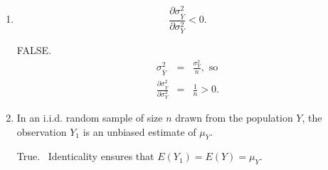 \documentclass[11pt]{article}
\begin{document}
\begin{enumerate}
\begin{enumerate}
\item 
\begin{equation*}
\frac{\partial \sigma _{\overline{Y}}^{2}}{\partial \sigma _{Y}^{2}}<0.
\end{equation*}

FALSE. 
\begin{eqnarray*}
\sigma _{\overline{Y}}^{2} &=&\frac{\sigma _{Y}^{2}}{n},\text{ so} \\
\frac{\partial \sigma _{\overline{Y}}^{2}}{\partial \sigma _{Y}^{2}} &=&%
\frac{1}{n}>0.
\end{eqnarray*}

\item In an i.i.d. random sample of size $n$ drawn from the population $Y$,
the observation $Y_{1}$ is an unbiased estimate of $\mu _{Y}.$

True. \ Identicality ensures that $E\left( Y_{1}\right) =E\left( Y\right)
=\mu _{Y}.$
\end{enumerate}
\end{enumerate}
\end{document}

